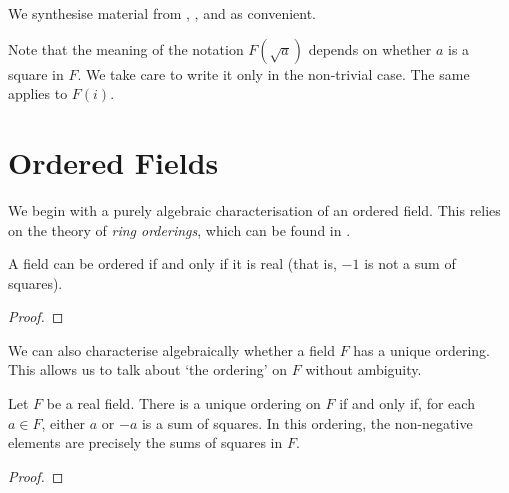 %

We synthesise material from \cite{Bochnak1998}, \cite{Knebusch2022}, \cite{Jacobson2012I} and \cite{Jacobson2012II} as convenient. 

Note that the meaning of the notation $F(\sqrt{a})$ depends on whether $a$ is a square in $F$. We take care to write it only in the non-trivial case. The same applies to $F(i)$.

\section{Ordered Fields} 

We begin with a purely algebraic characterisation of an ordered field. This relies on the theory of \textit{ring orderings}, which can be found in \cite{Lam1984}.

\begin{theorem}
  \label{thm:ord_iff_real}
  \leanok
  A field can be ordered if and only if it is real (that is, $-1$ is not a sum of squares).
\end{theorem}
\begin{proof}
  \leanok
\end{proof}

We can also characterise algebraically whether a field $F$ has a unique ordering. This allows us to talk about `the ordering' on $F$ without ambiguity.

\begin{lemma}
  \label{lem:unique_ord_cond}
  \leanok
  Let $F$ be a real field. There is a unique ordering on $F$ if and only if, for each $a\in F$, either $a$ or $-a$ is a sum of squares. In this ordering, the non-negative elements are precisely the sums of squares in $F$.
\end{lemma}
\begin{proof}
  \leanok
\end{proof}

